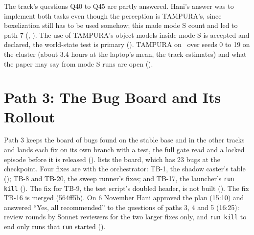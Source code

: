 The track's questions Q40 to Q45 are partly answered. Hani's answer was to implement
both tasks even though the perception is TAMPURA's, since boxelization still has to
be used somehow; this made mode S count and led to path 7 (, ). The use of
TAMPURA's object models inside mode S is accepted and declared, the world-state test
is primary (). TAMPURA on \cuncert\ over seeds 0 to 19 on the cluster
(about 3.4 hours at the laptop's mean, the track estimates) and what the paper may
say from mode S runs are open ().

\section{Path 3: The Bug Board and Its Rollout}
\label{sec:path3}

Path 3 keeps the board of bugs found on the stable base and in the other tracks and
lands each fix on its own branch with a test, the full gate read and a locked episode
before it is released ().  lists the board, which has 23 bugs at
the checkpoint. Four fixes are with the orchestrator: TB-1, the shadow caster's table
(); TB-8 and TB-20, the sweep runner's fixes; and TB-17, the launcher's
\texttt{run kill} (). The fix for TB-9, the test script's doubled header, is not
built (). The fix TB-16 is merged
(564ff5b). On 6 November Hani approved the plan (15:10) and answered ``Yes, all
recommended'' to the questions of paths 3, 4 and 5 (16:25): review rounds by Sonnet
reviewers for the two larger fixes only, and \texttt{run kill} to end only runs that
\texttt{run} started ().

